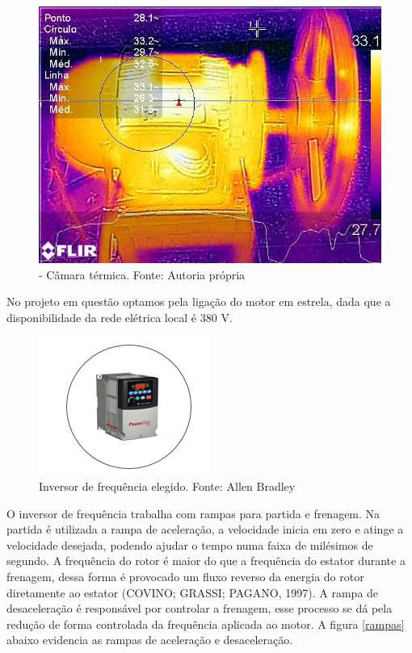 \begin{figure}[h!]
    \centering
	\includegraphics[keepaspectratio=true,scale= 0.5]{figuras/camera.jpg}
	\caption{- Câmara térmica. Fonte: Autoria própria }
    \label{camera}
\end{figure}

No projeto em questão optamos pela ligação do motor em estrela, dada que a disponibilidade da rede elétrica local é 380 V.

\begin{figure}[!h]
	\centering
		\includegraphics[keepaspectratio=true,scale=1.0]{figuras/3.png}
	\caption{Inversor de frequência elegido. Fonte: Allen Bradley}
    \label{inversor}
\end{figure}

O inversor de frequência trabalha com rampas para partida e frenagem. Na partida é utilizada a rampa de aceleração, a velocidade inicia em zero e atinge a velocidade desejada, podendo ajudar o tempo numa faixa de milésimos de segundo. A frequência do rotor é maior do que a frequência do estator durante a frenagem, dessa forma é provocado um fluxo reverso da energia do rotor diretamente ao estator (COVINO; GRASSI; PAGANO, 1997). A rampa de desaceleração é responsável por controlar a frenagem, esse processo se dá pela redução de forma controlada da frequência aplicada ao motor. A figura \ref{rampas} abaixo evidencia as rampas de aceleração e desaceleração.


